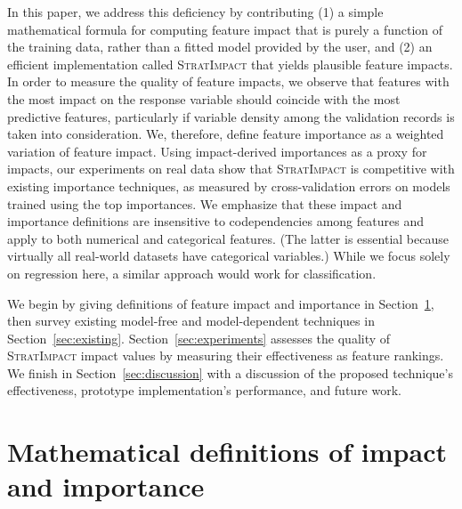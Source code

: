 \documentclass[11pt]{article}
\newcommand{\secref}[1]{Section~\ref{#1}}
\newcommand{\cut}[1]{}
\newcommand{\simp}{\fontfamily{cmr}\textsc{\small StratImpact}}
\begin{document}
In this paper, we address this deficiency by contributing (1) a simple mathematical formula for computing feature impact that is purely a function of the training data, rather than a fitted model  provided by the user, and (2) an efficient implementation called \simp{} that yields plausible feature impacts.   In order to measure the quality of feature impacts, we observe that features with the most impact on the response variable should coincide with the most predictive features, particularly if variable density among the validation records is taken into consideration. We, therefore, define feature importance as a weighted variation of feature impact. Using impact-derived importances as a proxy for impacts, our experiments on real data show that \simp{} is competitive with existing importance techniques, as measured by cross-validation errors on models trained using the top importances.   We emphasize that these impact and importance definitions are insensitive to codependencies among features and apply to both numerical and categorical features.  (The latter is essential because virtually all real-world datasets have categorical variables.) While we focus solely on regression here, a similar approach would work for classification.

We begin by giving definitions of feature impact and importance in \secref{sec:def}, then survey  existing model-free and model-dependent techniques in \secref{sec:existing}. \secref{sec:experiments} assesses the quality of \simp{} impact values by measuring their effectiveness as feature rankings. We finish in \secref{sec:discussion} with a discussion of the proposed technique's effectiveness, prototype implementation's performance, and future work.

\section{Mathematical definitions of impact and importance}\label{sec:def}

\cut{Practitioners loosely define feature importance as feature predictiveness, which presupposes a fitted predictive model, probably because importances are so often used for feature selection during model development.  Research  focuses on more accurately identifying the impact of features upon model predictions.  But, relying on a fitted model makes it difficult to tease apart the true feature importance from the ability of the model to exploit that feature for prediction purposes. Rather than measuring feature impact on {\em model predictions}, we propose avoiding the model completely to define feature importance as the average impact of a feature on the {\em data set response values}.}
\end{document}
